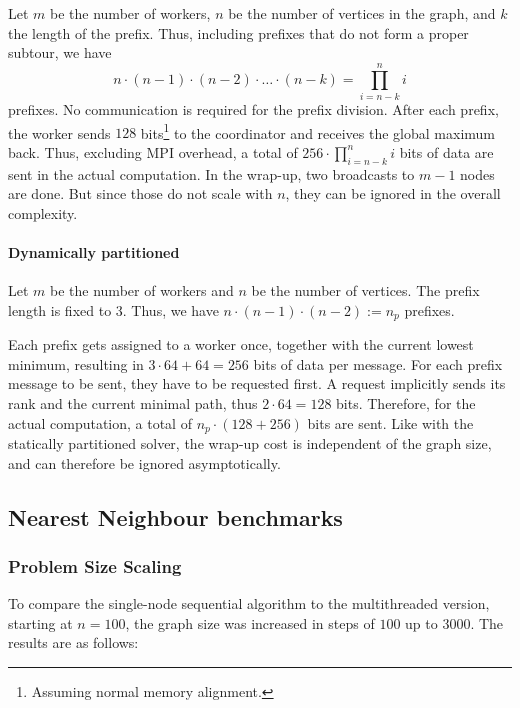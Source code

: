 Let $m$ be the number of workers, $n$ be the number of vertices in the graph, and $k$ the length of the prefix. Thus, including prefixes that do not form a proper subtour, we have 
\[
    n \cdot (n-1) \cdot (n-2) \cdot \dots \cdot (n-k) = \prod_{i=n-k}^n i
\]
prefixes. No communication is required for the prefix division. After each prefix, the worker sends $128$ bits\footnote{Assuming normal memory alignment.} to the coordinator and receives the global maximum back. Thus, excluding \ac{MPI} overhead, a total of $256 \cdot \prod_{i=n-k}^n i$ bits of data are sent in the actual computation. In the wrap-up, two broadcasts to $m-1$ nodes are done. But since those do not scale with $n$, they can be ignored in the overall complexity.

\paragraph{Dynamically partitioned}
Let $m$ be the number of workers and $n$ be the number of vertices. The prefix length is fixed to $3$. Thus, we have $n\cdot(n-1)\cdot(n-2) := n_{p}$ prefixes.

Each prefix gets assigned to a worker once, together with the current lowest minimum, resulting in $3\cdot64+64=256$ bits of data per message. For each prefix message to be sent, they have to be requested first. A request implicitly sends its rank and the current minimal path, thus $2\cdot64=128$ bits. Therefore, for the actual computation, a total of $n_p \cdot (128+256)$ bits are sent. Like with the statically partitioned solver, the wrap-up cost is independent of the graph size, and can therefore be ignored asymptotically.

\subsection{Nearest Neighbour benchmarks}

\subsubsection{Problem Size Scaling}
To compare the single-node sequential algorithm to the multithreaded version, starting at $n=100$, the graph size was increased in steps of $100$ up to $3000$. The results are as follows:

